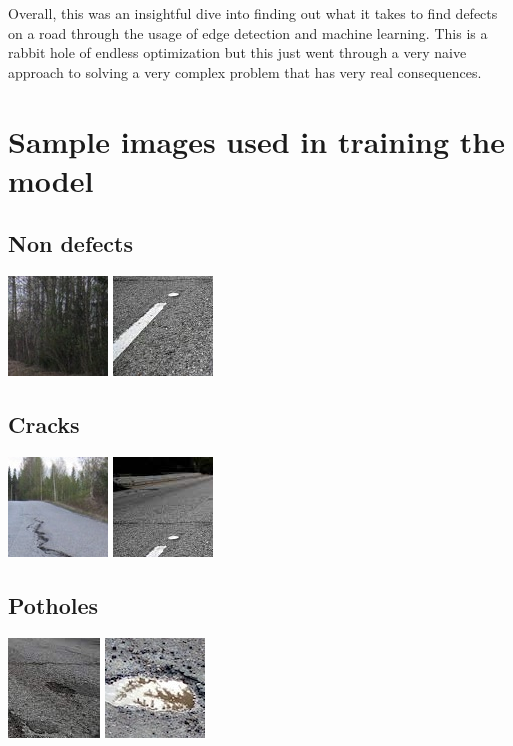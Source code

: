 \documentclass[12pt, letterpaper, twoside]{article}
\begin{document}
Overall, this was an insightful dive into finding out what it takes to find defects on a road through the usage of edge detection and machine learning.
This is a rabbit hole of endless optimization but this just went through a very naive approach to solving a very complex problem that has very real consequences.

\appendix

\section{Sample images used in training the model}\label{app:train_data}

\subsection{Non defects}
\includegraphics{rd1_0.jpg}
\includegraphics{rd2_9.jpg}

\subsection{Cracks}
\includegraphics{rd1_3.jpg}
\includegraphics{rd2_2.jpg}

\subsection{Potholes}
\includegraphics{rd2_5.jpg}
\includegraphics{rd3_9.jpg}
\end{document}
